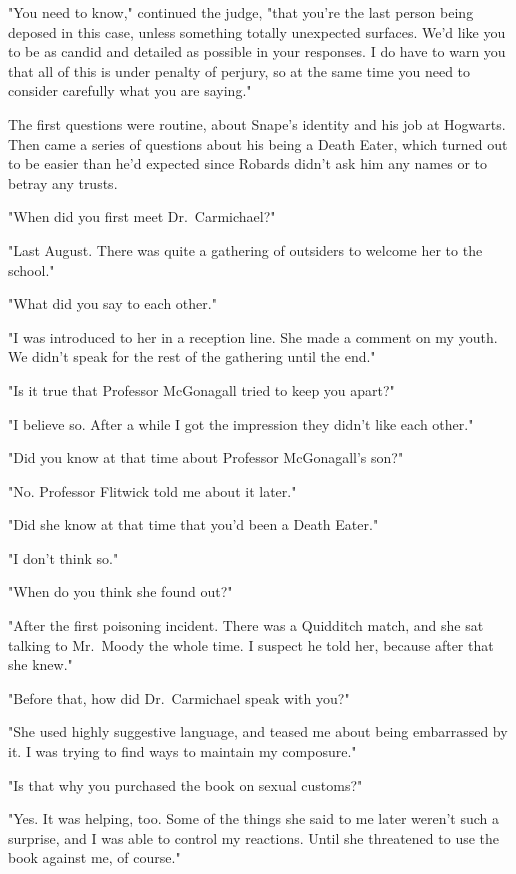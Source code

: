 "You need to know," continued the judge, "that you're the last person being deposed in this case, unless something totally unexpected surfaces. We'd like you to be as candid and detailed as possible in your responses. I do have to warn you that all of this is under penalty of perjury, so at the same time you need to consider carefully what you are saying."

The first questions were routine, about Snape's identity and his job at Hogwarts. Then came a series of questions about his being a Death Eater, which turned out to be easier than he'd expected since Robards didn't ask him any names or to betray any trusts.

"When did you first meet Dr.~Carmichael?"

"Last August. There was quite a gathering of outsiders to welcome her to the school."

"What did you say to each other."

"I was introduced to her in a reception line. She made a comment on my youth. We didn't speak for the rest of the gathering until the end."

"Is it true that Professor McGonagall tried to keep you apart?"

"I believe so. After a while I got the impression they didn't like each other."

"Did you know at that time about Professor McGonagall's son?"

"No. Professor Flitwick told me about it later."

"Did she know at that time that you'd been a Death Eater."

"I don't think so."

"When do you think she found out?"

"After the first poisoning incident. There was a Quidditch match, and she sat talking to Mr.~Moody the whole time. I suspect he told her, because after that she knew."

"Before that, how did Dr.~Carmichael speak with you?"

"She used highly suggestive language, and teased me about being embarrassed by it. I was trying to find ways to maintain my composure."

"Is that why you purchased the book on sexual customs?"

"Yes. It was helping, too. Some of the things she said to me later weren't such a surprise, and I was able to control my reactions. Until she threatened to use the book against me, of course."

